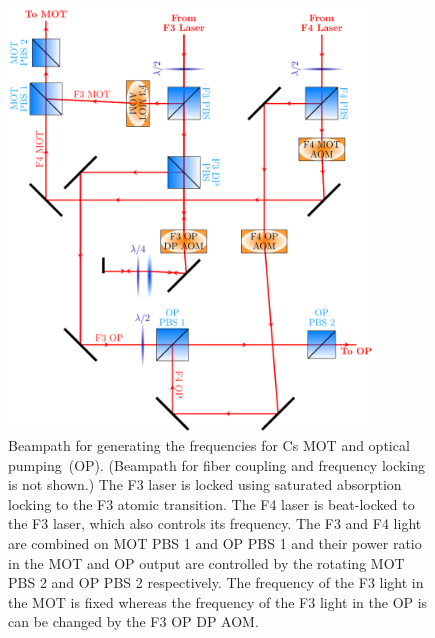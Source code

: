 \begin{figure}
  \centering
  \includegraphics[width=0.866\textwidth]{figures/loading_cs_res_beampath.pdf}
  \caption[Beampath for Cs D2 light.]{
    Beampath for generating the frequencies for Cs MOT and optical pumping~(OP).
    (Beampath for fiber coupling and frequency locking is not shown.)
    The F3 laser is locked using saturated absorption locking
    to the F3 atomic transition.
    The F4 laser is beat-locked to the F3 laser, which also controls its frequency.
    The F3 and F4 light are combined on MOT PBS 1 and OP PBS 1
    and their power ratio in the MOT and OP output are controlled by the
    rotating MOT PBS 2 and OP PBS 2 respectively.
    The frequency of the F3 light in the MOT is fixed whereas
    the frequency of the F3 light in the OP is can be changed by the F3 OP DP AOM.
    \label{fig:loading:free-space:cs-res-beampath}}
\end{figure}

